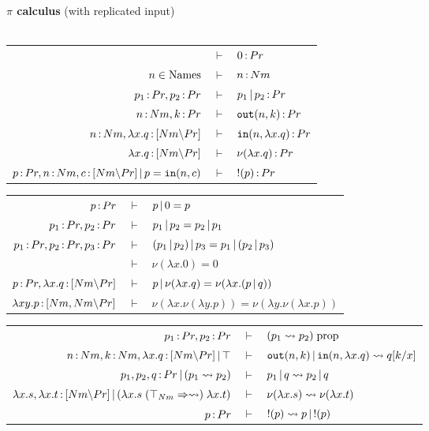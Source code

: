 \documentclass{article}
\begin{document}
\begin{mdframed}
    \begin{center}
    \textbf{$\pi$ calculus} (with replicated input)
    \\~\\
    \renewcommand{\arraystretch}{1.2}
        \begin{tabular}{rcl}
             & $\vdash$ & $0\,{:}\, Pr$\\
             $n\in \mathrm{Names}$ & $\vdash$ & $n\,{:}\, Nm$\\
             $p_1\,{:}\, Pr, p_2\,{:}\, Pr$ & $\vdash$ & $p_1\,|\, p_2\,{:}\, Pr$\\
             $n\,{:}\, Nm, k\,{:}\, Pr$ & $\vdash$ & $\mathtt{out}(n,k)\,{:}\, Pr$\\
             $n\,{:}\, Nm, \lambda x.q\,{:}\, [Nm{\setminus} Pr]$ & $\vdash$ & $\mathtt{in}(n,\lambda x.q)\,{:}\, Pr$\\
             $\lambda x.q\,{:}\, [Nm{\setminus} Pr]$ & $\vdash$ & $\nu(\lambda x.q)\,{:}\, Pr$\\
             $p\,{:}\, Pr, n\,{:}\, Nm, c\,{:}\, [Nm{\setminus} Pr]\,|\, p=\mathtt{in}(n,c)$ & $\vdash$ & $!(p)\,{:}\, Pr$
        \end{tabular}

        \vspace{1em}

        \begin{tabular}{rcl}
            $p\,{:}\, Pr$ & $\vdash$ & $p\,|\, 0 = p$\\
            $p_1\,{:}\, Pr, p_2\,{:}\, Pr$ & $\vdash$ & $p_1\,|\, p_2 = p_2\,|\, p_1$\\
            $p_1\,{:}\, Pr,p_2\,{:}\, Pr,p_3\,{:}\, Pr$ & $\vdash$ & $(p_1\,|\, p_2)\,|\, p_3 = p_1\,|\, (p_2\,|\, p_3)$\\
            & $\vdash$ & $\nu(\lambda x.0) = 0$\\
            $p\,{:}\, Pr, \lambda x.q\,{:}\, [Nm{\setminus} Pr]$ & $\vdash$ & $p\,|\, \nu(\lambda x.q) = \nu(\lambda x.(p\,|\, q))$\\
            $\lambda xy.p\,{:}\, [Nm,Nm{\setminus} Pr]$ & $\vdash$ & $\nu(\lambda x.\nu(\lambda y.p)) = \nu(\lambda y.\nu(\lambda x.p))$
        \end{tabular}

        \vspace{1em}

        \begin{tabular}{rcl}
             $p_1\,{:}\, Pr,p_2\,{:}\, Pr$ & $\vdash$ & $(p_1\rightsquigarrow p_2)\; \mathrm{prop}$\\
             $n\,{:}\, Nm, k\,{:}\, Nm, \lambda x.q\,{:}\, [Nm{\setminus} Pr]\,|\, \top$ & $\vdash$ & $\mathtt{out}(n,k)\,|\, \mathtt{in}(n,\lambda x.q)\rightsquigarrow  q[k/x]$\\
             $p_1,p_2,q\,{:}\, Pr\,|\, (p_1\rightsquigarrow p_2)$ & $\vdash$ & $ p_1\,|\, q\rightsquigarrow  p_2\,|\, q$\\
             $\lambda x.s, \lambda x.t\,{:}\, [Nm{\setminus} Pr] \,|\, (\lambda x.s \;(\top_{Nm}\Rightarrow \rightsquigarrow)\; \lambda x.t)$ & $\vdash$ & $\nu(\lambda x.s)\rightsquigarrow \nu(\lambda x.t)$\\
            $p\,{:}\, Pr$ & $\vdash$ & $!(p) \rightsquigarrow p\,|\, !(p)$
        \end{tabular}
    \end{center}
\end{mdframed}
\end{document}

